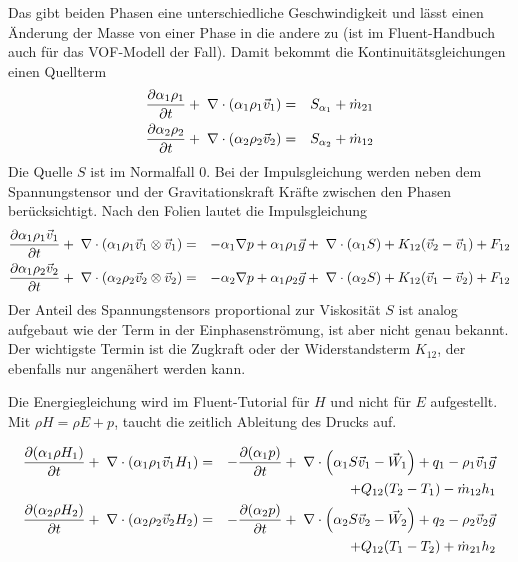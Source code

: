 Das gibt beiden Phasen eine unterschiedliche Geschwindigkeit und lässt
einen Änderung der Masse von einer Phase in die andere zu (ist im
Fluent-Handbuch auch für das VOF-Modell der Fall). Damit bekommt die
Kontinuitätsgleichungen einen Quellterm
\begin{eqnarray}
\frac{\partial \alpha_1 \rho_1 }{\partial t} + \;\nabla \cdot (\alpha_1\rho_1 \vec{v}_1) 
&=& S_{\alpha_1} + \dot{m}_{21}\\ \nonumber
\frac{\partial \alpha_2 \rho_2 }{\partial t} + \;\nabla \cdot (\alpha_2\rho_2 \vec{v}_2) 
&=&  S_{\alpha_2} + \dot{m}_{12} \label{eq:eulerKonti}
\end{eqnarray}
Die Quelle $S$ ist im Normalfall 0. Bei der Impulsgleichung werden neben
dem Spannungstensor und der Gravitationskraft Kräfte zwischen den
Phasen berücksichtigt. Nach den Folien lautet die Impulsgleichung
\begin{eqnarray}
\frac{\partial \alpha_1 \rho_1 \vec{v}_1}{\partial t} + \;\nabla \cdot
(\alpha_1\rho_1 \vec{v}_1\otimes\vec{v}_1) &=& - \alpha_1 \nabla p +
\alpha_1\rho_1 \vec{g} + \;\nabla \cdot (\alpha_1 S) + K_{12} (\vec{v}_2 -
\vec{v}_1) + F_{12}\\ \nonumber
\frac{\partial \alpha_1 \rho_2 \vec{v}_2}{\partial t} + \;\nabla \cdot
(\alpha_2\rho_2 \vec{v}_2\otimes\vec{v}_2) &=& - \alpha_2 \nabla p +
\alpha_1\rho_2 \vec{g} + \;\nabla \cdot (\alpha_2 S) + K_{12} (\vec{v}_1 -
\vec{v}_2) + F_{12} \label{eq:eulerImp}
\end{eqnarray}
Der Anteil des Spannungstensors proportional zur Viskosität $S$ ist
analog aufgebaut wie der Term in der Einphasenströmung, ist aber nicht
genau bekannt. Der wichtigste Termin ist die Zugkraft oder der
Widerstandsterm $K_{12}$, der ebenfalls nur angenähert werden kann.

Die Energiegleichung wird im Fluent-Tutorial für $H$ und nicht für $E$
aufgestellt. Mit $\rho H = \rho E+p$, taucht die zeitlich Ableitung
des Drucks auf.

\begin{eqnarray}
\frac{\partial (\alpha_1 \rho H_1)}{\partial t} + \;\nabla \cdot (\alpha_1\rho_1
\vec{v}_1 H_1) &=& - \frac{\partial (\alpha_1 p)}{\partial t} +
\;\nabla \cdot \left(\alpha_1 S \vec{v}_1 - \vec{W}_1 \right) + q_1 - \rho_1
\vec{v}_1\vec{g} \nonumber \\
& &  + Q_{12} (T_2-T_1) - \dot{m}_{12} h_1 \nonumber \\
\frac{\partial (\alpha_2 \rho H_2)}{\partial t} + \;\nabla \cdot (\alpha_2\rho_2
\vec{v}_2 H_2) &=& - \frac{\partial (\alpha_2 p)}{\partial t} +
\;\nabla \cdot \left(\alpha_2 S \vec{v}_2 - \vec{W}_2 \right) + q_2 - \rho_2
\vec{v}_2\vec{g} \nonumber \\
& &  + Q_{12} (T_1-T_2) + \dot{m}_{21} h_2 \label{eq:eulerE}
\end{eqnarray}

